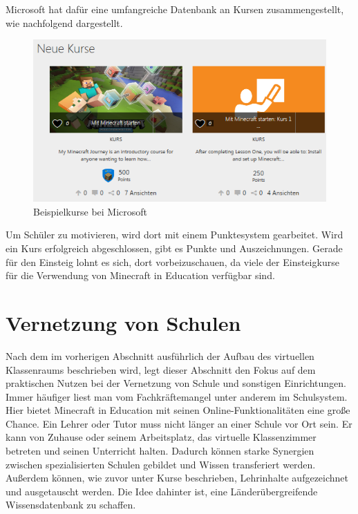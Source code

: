 Microsoft hat dafür eine umfangreiche Datenbank an Kursen zusammengestellt, wie nachfolgend dargestellt.

\begin{figure}[ht]
	\centering
	\includegraphics[width=\textwidth,height=\textheight,keepaspectratio]{images/MicrosoftMinecraftCourses.png}
	\caption{Beispielkurse bei Microsoft \cite{MicrosoftMinecraftCourses}}
	\label{minecraftCourses}
\end{figure}

Um Schüler zu motivieren, wird dort mit einem Punktesystem gearbeitet. Wird ein Kurs erfolgreich abgeschlossen, gibt es Punkte und Auszeichnungen. Gerade für den Einsteig lohnt es sich, dort vorbeizuschauen, da viele der Einsteigkurse für die Verwendung von Minecraft in Education verfügbar sind.

\section{Vernetzung von Schulen}

Nach dem im vorherigen Abschnitt ausführlich der Aufbau des virtuellen Klassenraums beschrieben wird, legt dieser Abschnitt den Fokus auf dem praktischen Nutzen bei der Vernetzung von Schule und sonstigen Einrichtungen.
Immer häufiger liest man vom Fachkräftemangel unter anderem im Schulsystem. Hier bietet Minecraft in Education mit seinen Online-Funktionalitäten eine große Chance. Ein Lehrer oder Tutor muss nicht länger an einer Schule vor Ort sein. Er kann von Zuhause oder seinem Arbeitsplatz, das virtuelle Klassenzimmer betreten und seinen Unterricht halten. Dadurch können starke Synergien zwischen spezialisierten Schulen gebildet und Wissen transferiert werden.
Außerdem können, wie zuvor unter Kurse beschrieben, Lehrinhalte aufgezeichnet und ausgetauscht werden.
Die Idee dahinter ist, eine Länderübergreifende Wissensdatenbank zu schaffen.

